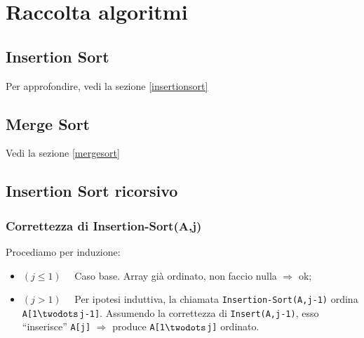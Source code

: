 \appendix
\appendixpage
\addappheadtotoc 

\section{Raccolta algoritmi}

\subsection{Insertion Sort}
Per approfondire, vedi la sezione \ref{insertionsort} 


\subsection{Merge Sort}
Vedi la sezione \ref{mergesort}



\subsection{Insertion Sort ricorsivo}




\subsubsection{Correttezza di Insertion-Sort(A,j)}
Procediamo per induzione:
\begin{itemize}
	\item[] $(j \leq 1) \quad$ Caso base. Array già ordinato, non faccio nulla $\Rightarrow$ ok;
	\item[] $(j > 1) \quad$ Per ipotesi induttiva, la chiamata \texttt{Insertion-Sort(A,j-1)}
	ordina \texttt{A[1$\twodots$j-1]}. Assumendo la correttezza di \texttt{Insert(A,j-1)}, esso
	``inserisce'' \texttt{A[j]} $\Rightarrow$ produce \texttt{A[1$\twodots$j]} ordinato.
\end{itemize}

